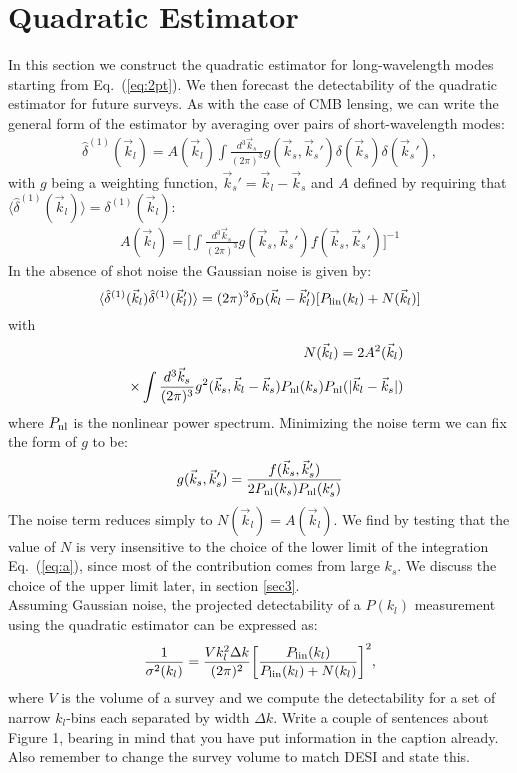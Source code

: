 \documentclass[prd,amsmath,amssymb,floatfix,superscriptaddress,nofootinbib,twocolumn]{revtex4-1}
\def\be{\begin{equation}}
\def\ee{\end{equation}}
\newcommand{\vs}{\nonumber\\}
\newcommand{\vk}{\vec{k}}
\newcommand{\ec}[1]{Eq.~(\ref{eq:#1})}
\newcommand{\eql}[1]{\label{eq:#1}}
\newcommand{\RC}[1]{{\color{darkorange} #1}}
\begin{document}
\section{Quadratic Estimator}\label{sec2}
In this section we construct the quadratic estimator for long-wavelength modes starting from \ec{2pt}. We then forecast the detectability of the quadratic estimator for future surveys. As with the case of CMB lensing, we can write the general form of the estimator by averaging over pairs of short-wavelength modes:
\begin{eqnarray}
\hat{\delta}^{(1)}(\vec{k}_l)=A(\vec{k}_l)\int \frac{d^3 \vec{k}_s}{(2\pi)^3} g(\vec{k}_s,\vec{k}_s'){\delta}(\vec{k}_s){\delta}(\vec{k}_s') \eql{quadest},
\end{eqnarray} 
with $g$ being a weighting function, $\vk_s'=\vk_l-\vk_s$ and $A$  defined by requiring that $\langle \hat{\delta}^{(1)}(\vec{k}_l) \rangle={\delta}^{(1)}(\vec{k}_l)$:
\begin{eqnarray}
A(\vec{k}_l)=\bigg[\int \frac{d^3 \vec{k}_s}{(2\pi)^3} g(\vec{k}_s,\vec{k}_s')f(\vec{k}_s,\vec{k}_s')  \bigg]^{-1} \eql{a}
\end{eqnarray}
In the absence of shot noise the Gaussian noise is given by:
\be 
\langle \hat{\delta}^{(1)}(\vk_{l})\hat{\delta}^{(1)}(\vk_{l}') \rangle = (2\pi)^3 \delta_{\rm D}(\vk_{l}-\vk_{l}')[P_{\rm lin}(k_{l})+N(\vk_l)]
\ee 
with 
\begin{eqnarray}
&&N(\vec{k}_{l})=2A^2(\vk_{l})\vs
&&\times\int \frac{d^3 \vec{k}_{s}}{(2\pi)^3} g^2(\vec{k}_{s},\vk_l-\vec{k}_{s})P_{\rm nl}(k_{s})P_{\rm nl}(|\vk_l-\vk_s|)
\end{eqnarray}
where $P_{\rm nl}$ is the nonlinear power spectrum. Minimizing the noise term we can fix the form of $g$ to be:
\begin{eqnarray}
g(\vec{k}_{s},\vec{k}_{s}')=\frac{f(\vec{k}_{s},\vec{k}_{s}')}{2P_{\rm nl}(k_{s})P_{\rm nl}(k_{s}')}
\end{eqnarray} 
The noise term reduces simply to $N(\vk_l)=A(\vk_l)$. We find by testing that the value of $N$ is very insensitive to the choice of the lower limit of the integration \ec{a}, since most of the contribution comes from large $k_s$. We  discuss the choice of the upper limit later, in section \ref{sec3}.\\
Assuming Gaussian noise, the projected detectability of a $P(k_l)$ measurement using the quadratic estimator can be expressed as:
\be
\frac{1}{\sigma^{2}(k_l)}=\frac{V k_l^2 \Delta k }{(2\pi)^2}\bigg[\frac{P_{\rm lin}(k_l)}{P_{\rm lin}(k_l)+N(k_l) }\bigg]^2 \eql{error},
\ee
where $V$ is the volume of a survey and we compute the detectability for a set of narrow $k_l$-bins each separated by width $\Delta k$.\RC{ Write a couple of
  sentences about Figure 1, bearing in mind that you have put information in
  the caption already. Also remember to change the survey volume to
match DESI and state this.}
\end{document}
